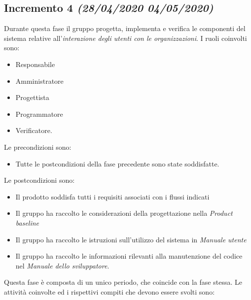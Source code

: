 \documentclass[../piano-di-progetto.tex]{subfiles}
\begin{document}
\subsection[Incremento 4]{Incremento 4 {\normalsize\normalfont\itshape(28/04/2020  04/05/2020)}}%
\label{sub:incremento_4}
Durante questa fase il gruppo progetta, implementa e verifica le componenti del sistema relative all'\textit{interazione degli utenti con le organizzazioni}.
I ruoli coinvolti sono:
\begin{itemize}
  \item Responsabile
  \item Amministratore
  \item Progettista
  \item Programmatore
  \item Verificatore.
\end{itemize}
Le precondizioni sono:
\begin{itemize}
  \item Tutte le postcondizioni della fase precedente sono state soddisfatte.
\end{itemize}
Le postcondizioni sono:
\begin{itemize}
  \item Il prodotto soddisfa tutti i requisiti associati con i flussi indicati
  \item Il gruppo ha raccolto le considerazioni della progettazione nella \textit{Product baseline}
  \item Il gruppo ha raccolto le istruzioni sull'utilizzo del sistema in \textit{Manuale utente}
  \item Il gruppo ha raccolto le informazioni rilevanti alla manutenzione del codice nel \textit{Manuale dello sviluppatore}.
\end{itemize}
Questa fase è composta di un unico periodo, che coincide con la fase stessa.
Le attività coinvolte ed i rispettivi compiti che devono essere svolti sono:
\end{document}
